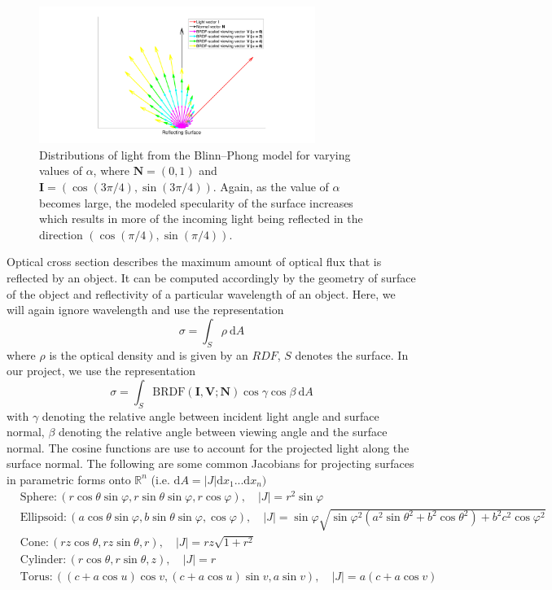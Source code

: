 \documentclass[11pt]{amsart}
\newcommand{\BRDF}{\mathrm{BRDF}}
\theoremstyle{definition}
\begin{document}
\begin{figure}[H]
 \includegraphics[width=0.8\textwidth]{./figs/BRDF_Vectors.pdf}
 \caption{Distributions of light from the Blinn--Phong model for varying values of $\alpha$, where $\mathbf{N} = (0,1)$ and $\mathbf{I} = (\cos(3\pi/4),\sin(3\pi/4))$. Again, as the value of $\alpha$ becomes large, the modeled specularity of the surface increases which results in more of the incoming light being reflected in the direction $(\cos(\pi/4),\sin(\pi/4))$.}
 \label{BRDFVectors}
\end{figure}

Optical cross section describes the maximum amount of optical flux that is reflected by an object. It can be computed accordingly by the geometry of surface of the object and reflectivity of a particular wavelength of an object. Here, we will again ignore wavelength and use the representation 
$$\sigma=\int_{S} \rho \: \mathrm{d}A$$
where $\rho$ is the optical density and is given by an $RDF$, $S$ denotes the surface. In our project, we use the representation
$$\sigma= \int_S\BRDF(\mathbf{I},\mathbf{V};\mathbf{N}) \cos\gamma\cos\beta \: \mathrm{d}A$$
with $\gamma$ denoting the relative angle between incident light angle and surface normal, $\beta$ denoting the relative angle between viewing angle and the surface normal. The cosine functions are use to account for the projected light along the surface normal. The following are some common Jacobians for projecting surfaces in parametric forms onto $\mathbb{R}^n$ (i.e. $\mathrm d A= |J| \mathrm{d}x_1...\mathrm{d}x_n)$
\begin{align}
&\nonumber\mbox{Sphere}:( r\cos\theta \sin\varphi, r\sin\theta \sin\varphi,  r\cos\varphi),   \quad |J|= r^2\sin\varphi         \\
&\nonumber\mbox{Ellipsoid} :(a\cos\theta \sin\varphi,b\sin\theta \sin\varphi,\cos\varphi),    \quad |J|=\sin\varphi  \sqrt{\sin\varphi^2( a^2\sin\theta^2+b^2\cos\theta^2)+b^2c^2\cos\varphi^2}       \\ 
&\nonumber\mbox{Cone}: (rz\cos\theta , rz\sin\theta , r),\quad |J|= rz\sqrt{1+r^2}        \\
&\nonumber\mbox{Cylinder}: ( r\cos\theta ,r\sin\theta, z), \quad |J|=r                \\
&\nonumber\mbox{Torus} :    ((c+a\cos u) \cos v,(c+a\cos u) \sin v, a\sin v), \quad |J|= a(c+a\cos v)           
\end{align}
\end{document}
